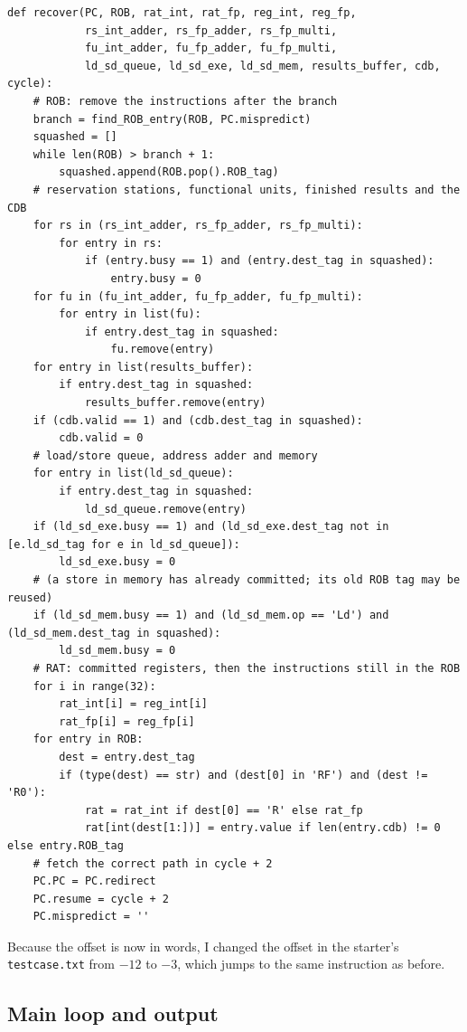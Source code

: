 \documentclass[11pt]{article}
\renewcommand{\_}{\origunderscore\allowbreak}
\begin{document}
\begin{lstlisting}
def recover(PC, ROB, rat_int, rat_fp, reg_int, reg_fp,
            rs_int_adder, rs_fp_adder, rs_fp_multi,
            fu_int_adder, fu_fp_adder, fu_fp_multi,
            ld_sd_queue, ld_sd_exe, ld_sd_mem, results_buffer, cdb, cycle):
    # ROB: remove the instructions after the branch
    branch = find_ROB_entry(ROB, PC.mispredict)
    squashed = []
    while len(ROB) > branch + 1:
        squashed.append(ROB.pop().ROB_tag)
    # reservation stations, functional units, finished results and the CDB
    for rs in (rs_int_adder, rs_fp_adder, rs_fp_multi):
        for entry in rs:
            if (entry.busy == 1) and (entry.dest_tag in squashed):
                entry.busy = 0
    for fu in (fu_int_adder, fu_fp_adder, fu_fp_multi):
        for entry in list(fu):
            if entry.dest_tag in squashed:
                fu.remove(entry)
    for entry in list(results_buffer):
        if entry.dest_tag in squashed:
            results_buffer.remove(entry)
    if (cdb.valid == 1) and (cdb.dest_tag in squashed):
        cdb.valid = 0
    # load/store queue, address adder and memory
    for entry in list(ld_sd_queue):
        if entry.dest_tag in squashed:
            ld_sd_queue.remove(entry)
    if (ld_sd_exe.busy == 1) and (ld_sd_exe.dest_tag not in [e.ld_sd_tag for e in ld_sd_queue]):
        ld_sd_exe.busy = 0
    # (a store in memory has already committed; its old ROB tag may be reused)
    if (ld_sd_mem.busy == 1) and (ld_sd_mem.op == 'Ld') and (ld_sd_mem.dest_tag in squashed):
        ld_sd_mem.busy = 0
    # RAT: committed registers, then the instructions still in the ROB
    for i in range(32):
        rat_int[i] = reg_int[i]
        rat_fp[i] = reg_fp[i]
    for entry in ROB:
        dest = entry.dest_tag
        if (type(dest) == str) and (dest[0] in 'RF') and (dest != 'R0'):
            rat = rat_int if dest[0] == 'R' else rat_fp
            rat[int(dest[1:])] = entry.value if len(entry.cdb) != 0 else entry.ROB_tag
    # fetch the correct path in cycle + 2
    PC.PC = PC.redirect
    PC.resume = cycle + 2
    PC.mispredict = ''
\end{lstlisting}

Because the offset is now in words, I changed the offset in the starter's \texttt{test\_case.txt}
from $-12$ to $-3$, which jumps to the same instruction as before.

\subsection{Main loop and output}
\end{document}

